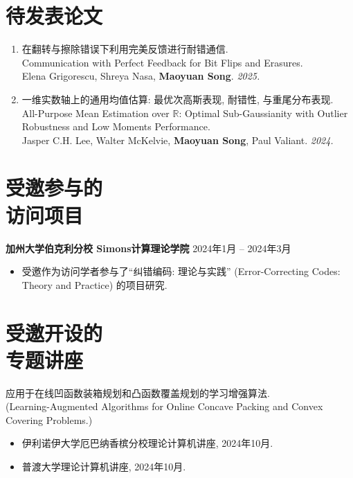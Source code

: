 \documentclass[margin, 10pt]{res-short} %
\begin{document}
\begin{resume}
\section{待发表论文}
\begin{enumerate}
\item 在翻转与擦除错误下利用完美反馈进行耐错通信.\\
Communication with Perfect Feedback for Bit Flips and Erasures.\\
Elena Grigorescu, Shreya Nasa, {\bf Maoyuan Song}. %
\emph{2025.}
\item 一维实数轴上的通用均值估算: 最优次高斯表现, 耐错性, 与重尾分布表现.\\
All-Purpose Mean Estimation over $\mathbb{R}$: Optimal Sub-Gaussianity with Outlier Robustness and Low Moments Performance.\\
Jasper C.H. Lee, Walter McKelvie, {\bf Maoyuan Song}, Paul Valiant. %
\emph{2024.}
\end{enumerate}


\section{受邀参与的\\访问项目}
{\bf 加州大学伯克利分校 Simons计算理论学院} \hfill 2024年1月 -- 2024年3月
\begin{itemize}
\item 受邀作为访问学者参与了``纠错编码: 理论与实践'' (Error-Correcting Codes: Theory and Practice) 的项目研究.
\end{itemize}

\section{受邀开设的\\专题讲座}
应用于在线凹函数装箱规划和凸函数覆盖规划的学习增强算法.\\
(Learning-Augmented Algorithms for Online Concave Packing and Convex Covering Problems.)\\
\begin{itemize}
\item 伊利诺伊大学厄巴纳香槟分校\;理论计算机讲座, 2024年10月.
\item 普渡大学\;理论计算机讲座, 2024年10月.
\end{itemize}


\end{resume}
\end{document}
